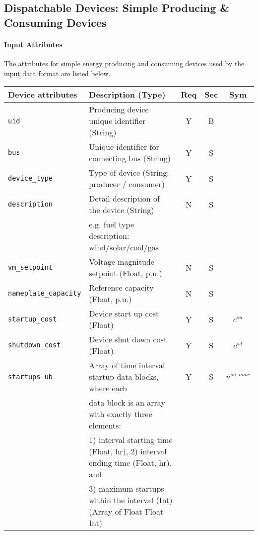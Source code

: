 \documentclass{article}
\begin{document}
\subsection{Dispatchable Devices: Simple Producing \& Consuming Devices}
\label{nom:gen_single}
\paragraph{Input Attributes} The attributes for
simple energy producing and consuming devices used by the input data format are listed below.
\begin{center}
\small
\begin{tabular}{ l | l | c | c | c |}
Device attributes & Description (Type) & Req & Sec & Sym\\
\hline
  {\tt uid} & Producing device unique identifier (String) & Y & B &  \\
  {\tt bus} & Unique identifier for connecting bus (String)& Y & S & \\
  {\tt device\_type} & Type of device (String: producer / consumer) & Y & S & \\
  {\tt description} & Detail description of the device  (String) & N & S & \\
      &e.g. fuel type description: wind/solar/coal/gas  &  &  & \\
  {\tt vm\_setpoint} & Voltage magnitude setpoint (Float, p.u.) & N & S & \\
  {\tt nameplate\_capacity} & Reference capacity (Float, p.u.) & N & S & \\
  {\tt startup\_cost} & Device start up cost (Float) & Y & S & $c^{su}$\\
  {\tt shutdown\_cost} & Device shut down cost (Float) & Y & S & $c^{sd}$\\
  {\tt startups\_ub} & Array of time interval startup data blocks, where each & Y & S & $u^{su,max}$\\
                     & data block is an array with exactly three elements: &   &   & \\
                     & 1) interval starting time (Float, hr), 2) interval ending time (Float, hr), and &   &   & \\
                     & 3) maximum startups within the interval (Int) (Array of Float Float Int) &   &   & \\


\end{tabular}
\end{center}
\end{document}
